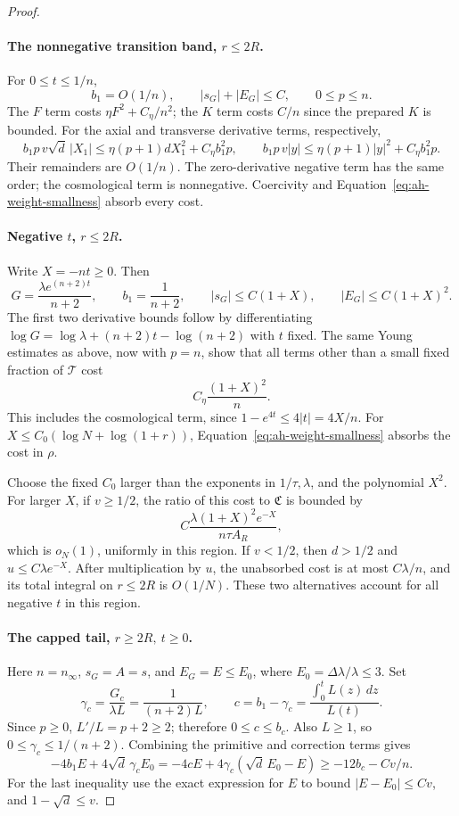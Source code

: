 \begin{proof}
\paragraph{The nonnegative transition band, \(r\le2R\).}
For \(0\le t\le1/n\),
\[
 b_1=O(1/n),\qquad |s_G|+|E_G|\le C,\qquad 0\le p\le n.
\]
The \(F\) term costs \(\eta F^2+C_\eta/n^2\); the \(K\) term
costs \(C/n\) since the prepared \(K\) is bounded.
For the axial and transverse derivative terms, respectively,
\[
 b_1p\,v\sqrt d\,|X_1|
       \le\eta(p+1)dX_1^2+C_\eta b_1^2p,\qquad
 b_1p\,v|y|
       \le\eta(p+1)|y|^2+C_\eta b_1^2p .
\]
Their remainders are \(O(1/n)\).
The zero-derivative negative term has the same order; the
cosmological term is nonnegative. Coercivity and
Equation~\eqref{eq:ah-weight-smallness} absorb every cost.

\paragraph{Negative \(t\), \(r\le2R\).}
Write \(X=-nt\ge0\). Then
\[
 G=\frac{\lambda e^{(n+2)t}}{n+2},\qquad
 b_1=\frac1{n+2},\qquad
 |s_G|\le C(1+X),\qquad |E_G|\le C(1+X)^2 .
\]
The first two derivative bounds follow by differentiating
\(\log G=\log\lambda+(n+2)t-\log(n+2)\) with \(t\) fixed.
The same Young estimates as above, now with \(p=n\), show that all
terms other than a small fixed fraction of \(\mathcal T\) cost
\[
 C_\eta\frac{(1+X)^2}{n}.
\]
This includes the cosmological term, since
\(1-e^{4t}\le4|t|=4X/n\).
For \(X\le C_0(\log N+\log(1+r))\), Equation~\eqref{eq:ah-weight-smallness}
absorbs the cost in \(\rho\).

Choose the fixed \(C_0\) larger than the exponents in
\(1/\tau,\lambda\), and the polynomial \(X^2\). For larger \(X\),
if \(v\ge1/2\), the ratio of this cost to \(\mathfrak C\) is bounded
by
\[
 C\frac{\lambda(1+X)^2e^{-X}}{n\tau A_R},
\]
which is \(o_N(1)\), uniformly in this region.
If \(v<1/2\), then \(d>1/2\) and
\(u\le C\lambda e^{-X}\). After multiplication by \(u\), the
unabsorbed cost is at most \(C\lambda/n\), and its total integral
on \(r\le2R\) is \(O(1/N)\).
These two alternatives account for all negative \(t\) in this region.

\paragraph{The capped tail, \(r\ge2R,\ t\ge0\).}
Here \(n=n_\infty\), \(s_G=A=s\), and \(E_G=E\le E_0\), where
\(E_0=\Delta\lambda/\lambda\le3\). Set
\[
 \gamma_c=\frac{G_c}{\lambda L}=\frac1{(n+2)L},\qquad
 c=b_1-\gamma_c=\frac{\int_0^tL(z)\,dz}{L(t)}.
\]
Since \(p\ge0\), \(L'/L=p+2\ge2\); therefore \(0\le c\le b_c\).
Also \(L\ge1\), so \(0\le\gamma_c\le1/(n+2)\).
Combining the primitive and correction terms gives
\[
 -4b_1E+4\sqrt d\,\gamma_cE_0
 =-4cE+4\gamma_c(\sqrt d\,E_0-E)
 \ge-12b_c-Cv/n.
\]
For the last inequality use the exact expression for \(E\) to
bound \(|E-E_0|\le Cv\), and \(1-\sqrt d\le v\).


\end{proof}
